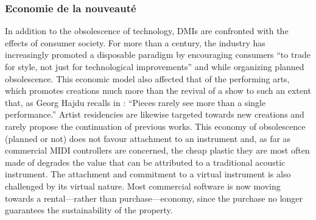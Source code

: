 \subsubsection{Economie de la nouveauté}
In addition to the obsolescence of technology, DMIs are confronted with the effects of consumer society. For more than a century, the industry has increasingly promoted a disposable paradigm by encouraging consumers “to trade for style, not just for technological improvements” \cite{slade_made_2006} and while organizing planned obsolescence.
	This economic model also affected that of the performing arts, which promotes creations much more than the revival of a show to such an extent that, as Georg Hajdu recalls in \cite{hajdu_disposable_2016}: “Pieces rarely see more than a single performance.” Artist residencies are likewise targeted towards new creations and rarely propose the continuation of previous works.
	This economy of obsolescence (planned or not) does not favour attachment to an instrument and, as far as commercial MIDI controllers are concerned, the cheap plastic they are most often made of degrades the value that can be attributed to a traditional acoustic instrument. The attachment and commitment to a virtual instrument is also challenged by its virtual nature. Most commercial software is now moving towards a rental—rather than purchase—economy, since the purchase no longer guarantees the sustainability of the property.
	
